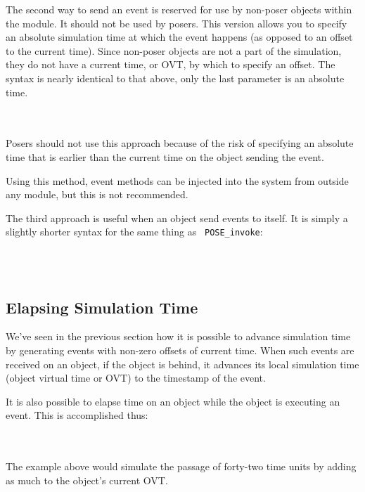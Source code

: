 \documentclass[10pt]{article}
\begin{document}
The second way to send an event is reserved for use by non-poser
objects within the module.  It should not be used by posers.  This
version allows you to specify an absolute simulation time at which the
event happens (as opposed to an offset to the current time).  Since
non-poser objects are not a part of the simulation, they do not have a
current time, or OVT, by which to specify an offset.  The syntax is
nearly identical to that above, only the last parameter is an absolute
time.

~\\
\\

Posers should not use this approach because of the risk of specifying
an absolute time that is earlier than the current time on the object
sending the event.  

Using this method, event methods can be injected into the system from
outside any module, but this is not recommended.

The third approach is useful when an object send events to itself.  It
is simply a slightly shorter syntax for the same thing as {\tt
POSE\_invoke}: 

~\\
\\

\subsection{Elapsing Simulation Time}

We've seen in the previous section how it is possible to advance
simulation time by generating events with non-zero offsets of current
time.  When such events are received on an object, if the object is
behind, it advances its local simulation time (object virtual time or
OVT) to the timestamp of the event.

It is also possible to elapse time on an object while the object is
executing an event.  This is accomplished thus:

~\\
\\

The example above would simulate the passage of forty-two time units
by adding as much to the object's current OVT.
\end{document}
